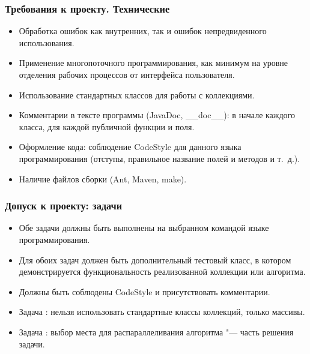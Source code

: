 \documentclass[default]{beamer}
\begin{document}
	\begin{frame}
		\frametitle{Требования к проекту. Технические}
		
		\begin{itemize}
			\item Обработка ошибок как внутренних, так и ошибок непредвиденного использования.
			\item Применение многопоточного программирования, как минимум на уровне отделения рабочих процессов от интерфейса пользователя.
			\item Использование стандартных классов для работы с коллекциями.
			\item Комментарии в тексте программы (JavaDoc, \_\_doc\_\_): в начале каждого класса, для каждой публичной функции и поля.
			\item Оформление кода: соблюдение CodeStyle для данного языка программирования (отступы, правильное название полей и методов и т.~д.).
			\item Наличие файлов сборки (Ant, Maven, make).
		\end{itemize}
	\end{frame}

	\begin{frame}
		\frametitle{Допуск к проекту: задачи}
		
		\begin{itemize}
			\item Обе задачи должны быть выполнены на выбранном командой языке программирования.
			\item Для обоих задач должен быть дополнительный тестовый класс, в котором демонстрируется функциональность реализованной коллекции или алгоритма.
			\item Должны быть соблюдены CodeStyle и присутствовать комментарии.
			\item Задача : нельзя использовать стандартные классы коллекций, только массивы.
			\item Задача : выбор места для распараллеливания алгоритма "--- часть решения задачи.
		\end{itemize}
	\end{frame}

\end{document}
